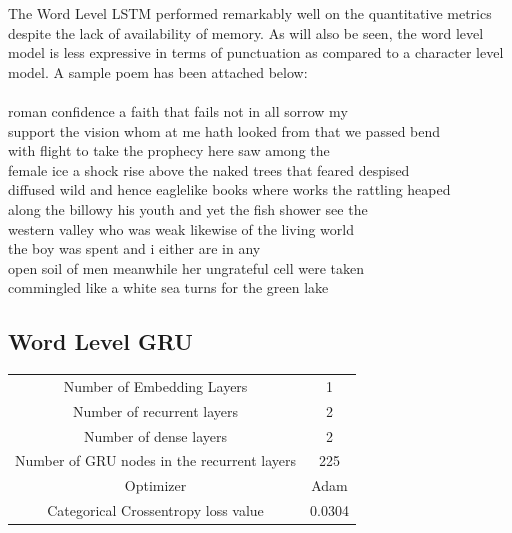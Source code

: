 \documentclass[15pt]{article}
\begin{document}
The Word Level LSTM performed remarkably well on the quantitative metrics despite the lack of availability of memory. As will also be seen, the word level model is less expressive in terms of punctuation as compared to a character level model. A sample poem has been attached below:\\\\
roman confidence a faith that fails not in all sorrow my\\
support the vision whom at me hath looked from that we passed bend \\
 with flight to take the prophecy here saw among the \\
 female ice a shock rise above the naked trees that feared despised\\ 
 diffused wild and hence eaglelike books where works the rattling heaped \\
 along the billowy his youth and yet the fish shower see the \\
 western valley who was weak likewise of the living world \\
 the boy was spent and i either are in any \\
 open soil of men meanwhile her ungrateful cell were taken \\
 commingled like a white sea turns for the green lake \\


\subsection{Word Level GRU}
\begin{center}
\begin{tabular}{c c}
Number of Embedding Layers & 1\\
Number of recurrent layers & 2 \\
Number of dense layers & 2 \\
Number of GRU nodes in the recurrent layers  & 225 \\
Optimizer & Adam \\
Categorical Crossentropy loss value & 0.0304 \\
\end{tabular}
\end{center}
\end{document}
